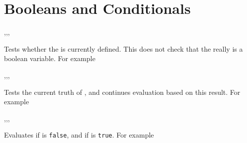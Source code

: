 \documentclass[oneside]{book}
\begin{document}
\section{Booleans and Conditionals}

\begin{function}{\boolIfExist,\boolIfExistT,\boolIfExistF,\boolIfExistTF}
\begin{syntax}
 
  
  
   
\end{syntax}
Tests whether the  is currently defined.  This does not
check that the  really is a boolean variable.
For example
\begin{demohigh}
\boolIfExistTF {} {}
\boolIfExistTF {} {}
\end{demohigh}
\end{function}

\begin{function}{\boolVarIf,\boolVarIfT,\boolVarIfF,\boolVarIfTF}
\begin{syntax}
 
  
  
   
\end{syntax}
Tests the current truth of , and continues evaluation
based on this result. For example
\begin{demohigh}
\boolSetTrue \lTmpaBool
\boolVarIfTF {} {}
\boolSetFalse \lTmpaBool
\boolVarIfTF {} {}
\end{demohigh}
\end{function}

\begin{function}{\boolVarNot,\boolVarNotT,\boolVarNotF,\boolVarNotTF}
\begin{syntax}
 
  
  
   
\end{syntax}
Evaluates  if  is \verb!false!,
and  if  is \verb!true!.
For example
\begin{demohigh}
 {} {}
\end{demohigh}
\end{function}
\end{document}
